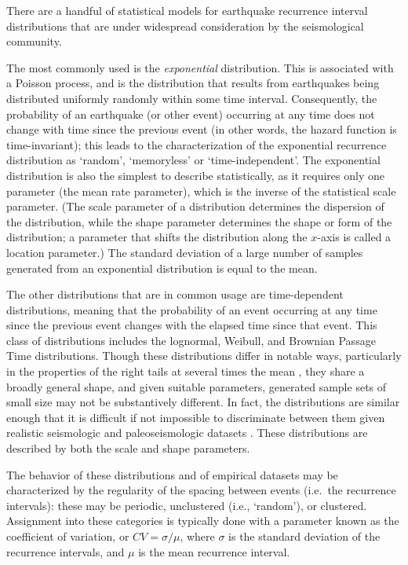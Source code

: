 \documentclass[se]{copernicus}
\begin{document}
There are a handful of statistical models for earthquake recurrence
interval distributions that are under widespread consideration by the
seismological community.

The most commonly used is the \emph{exponential} distribution. This is
associated with a Poisson process, and is the distribution that results
from earthquakes being distributed uniformly randomly within some time interval.
Consequently, the probability of an earthquake (or other event) occurring at any
time does not change with time since the previous event (in other words, the
hazard function is time-invariant); this leads to the characterization of the
exponential recurrence distribution as `random', `memoryless' or
`time-independent'. The exponential distribution is also the simplest to
describe statistically, as it requires only one parameter (the mean rate
parameter), which is the inverse of the statistical scale parameter. (The scale 
parameter of a distribution determines the dispersion of the distribution, 
while the shape parameter determines the shape or form of the distribution; a 
parameter that shifts the distribution along the $x$-axis is called a location 
parameter.) The standard deviation of a large number of samples generated from 
an exponential distribution is equal to the mean.

The other distributions that are in common usage are time-dependent
distributions, meaning that the probability of an event occurring at any
time since the previous event changes with the elapsed time since that
event. This class of distributions includes the lognormal, Weibull, and
Brownian Passage Time \citep{matthews_brownian_2002} distributions.
Though these distributions differ in notable ways, particularly in the
properties of the right tails at several times the mean
\citep{davis_longer_1989,matthews_brownian_2002}, they share a broadly
general shape, and given suitable parameters, generated sample sets of
small size may not be substantively different. In fact, the
distributions are similar enough that it is difficult if not impossible
to discriminate between them given realistic seismologic and
paleoseismologic datasets
\citep{matthews_brownian_2002,ogata_estimating_1999}. These
distributions are described by both the scale and shape parameters.

The behavior of these distributions and of empirical datasets may be
characterized by the regularity of the spacing between events (i.e.~the
recurrence intervals): these may be periodic, unclustered (i.e.,
`random'), or clustered. Assignment into these categories is typically
done with a parameter known as the coefficient of variation, or
\(CV = \sigma / \mu\), where \(\sigma\) is the standard deviation of
the recurrence intervals, and \(\mu\) is the mean recurrence interval.
\end{document}
